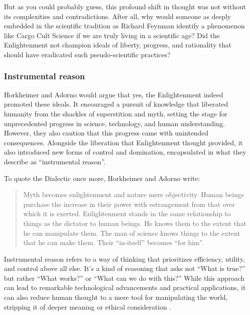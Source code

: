 %

But as you could probably guess, this profound shift in thought was not without
its complexities and contradictions. After all, why would someone as deeply
embedded in the scientific tradition as Richard Feynman identify a phenomenon
like Cargo Cult Science if we are truly living in a scientific age? Did the
Enlightenment not champion ideals of liberty, progress, and rationality that
should have eradicated such pseudo-scientific practices?

\subsubsection*{Instrumental reason}
Horkheimer and Adorno would argue that yes, the Enlightenment indeed promoted
these ideals. It encouraged a pursuit of knowledge that liberated humanity from
the shackles of superstition and myth, setting the stage for unprecedented
progress in science, technology, and human understanding. However, they also
caution that this progress came with unintended consequences. Alongside the
liberation that Enlightenment thought provided, it also introduced new forms of
control and domination, encapsulated in what they describe as \enquote{instrumental
reason}.

To quote the Dialectic once more, Horkheimer and Adorno write: 
\blockquote{
  Myth becomes enlightenment and nature mere objectivity. Human
beings purchase the increase in their power with estrangement from that
over which it is exerted. Enlightenment stands in the same relationship to
things as the dictator to human beings. He knows them to the extent that
he can manipulate them. The man of science knows things to the extent
that he can make them. Their \enquote{in-itself} becomes \enquote{for him}.
}

Instrumental reason refers to a way of thinking that prioritizes efficiency,
utility, and control above all else. It’s a kind of reasoning that asks not
\enquote{What is true?} but rather \enquote{What works?} or \enquote{What can
we do with this?} While this approach can lead to remarkable technological
advancements and practical applications, it can also reduce human thought to a
mere tool for manipulating the world, stripping it of deeper meaning or ethical
consideration \cite{horkheimerZurKritikInstrumentellen2007}.

